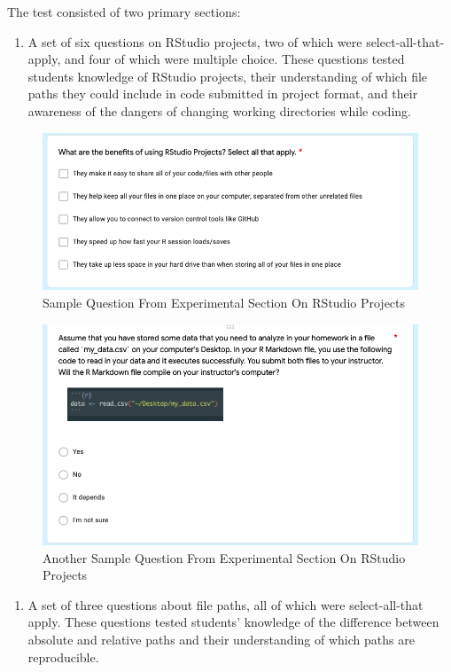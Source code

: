 \documentclass[12pt,twoside]{reedthesis}
\providecommand{\tightlist}{%
  \setlength{\itemsep}{0pt}\setlength{\parskip}{0pt}}
\begin{document}
The test consisted of two primary sections:
\begin{enumerate}
\def\labelenumi{\arabic{enumi}.}
\tightlist
\item
  A set of six questions on RStudio projects, two of which were select-all-that-apply, and four of which were multiple choice. These questions tested students knowledge of RStudio projects, their understanding of which file paths they could include in code submitted in project format, and their awareness of the dangers of changing working directories while coding.
\end{enumerate}
\begin{figure}
\includegraphics[width=1\linewidth]{figure/projects-1} \caption{Sample Question From Experimental Section On RStudio Projects}\label{fig:unnamed-chunk-63}
\end{figure}
\begin{figure}
\includegraphics[width=1\linewidth]{figure/projects-2} \caption{Another Sample Question From Experimental Section On RStudio Projects}\label{fig:unnamed-chunk-64}
\end{figure}
\begin{enumerate}
\def\labelenumi{\arabic{enumi}.}
\setcounter{enumi}{1}
\tightlist
\item
  A set of three questions about file paths, all of which were select-all-that apply. These questions tested students' knowledge of the difference between absolute and relative paths and their understanding of which paths are reproducible.
\end{enumerate}
\end{document}
